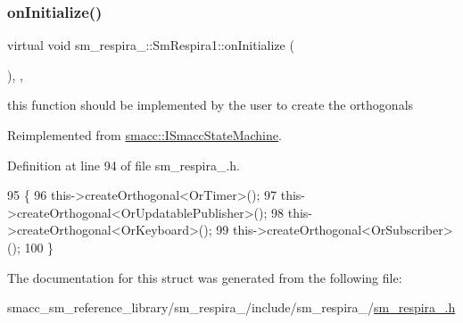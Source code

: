 \subsubsection{\texorpdfstring{on\+Initialize()}{onInitialize()}}
{\footnotesize\ttfamily virtual void sm\+\_\+respira\+\_\+::\+Sm\+Respira1\+::on\+Initialize (\begin{DoxyParamCaption}{ }\end{DoxyParamCaption})\hspace{0.3cm}{\ttfamily [inline]}, {\ttfamily [override]}, {\ttfamily [virtual]}}



this function should be implemented by the user to create the orthogonals 



Reimplemented from \hyperlink{classsmacc_1_1ISmaccStateMachine_ac2982c6c8283663e5e1e8a7c82f511ec}{smacc\+::\+I\+Smacc\+State\+Machine}.



Definition at line 94 of file sm\+\_\+respira\+\_.\+h.


\begin{DoxyCode}
95     \{
96         this->createOrthogonal<OrTimer>();
97         this->createOrthogonal<OrUpdatablePublisher>();
98         this->createOrthogonal<OrKeyboard>();
99         this->createOrthogonal<OrSubscriber>();
100     \}
\end{DoxyCode}


The documentation for this struct was generated from the following file\+:\begin{DoxyCompactItemize}
\item 
smacc\+\_\+sm\+\_\+reference\+\_\+library/sm\+\_\+respira\+\_/include/sm\+\_\+respira\+\_/\hyperlink{sm__respira__1_8h}{sm\+\_\+respira\+\_.\+h}\end{DoxyCompactItemize}

